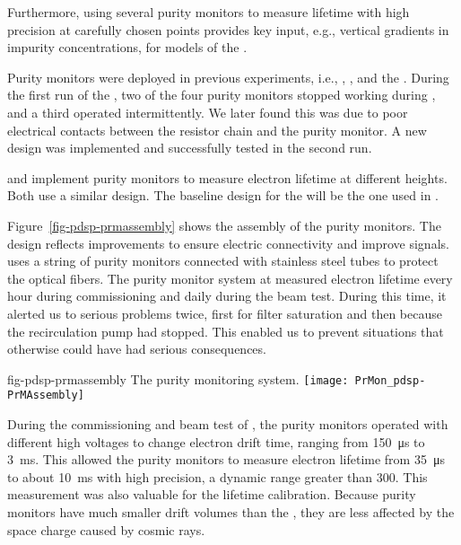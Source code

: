 Furthermore, using several purity monitors to measure lifetime with high precision at carefully chosen points provides key input, e.g.,  vertical gradients in impurity concentrations, for  models of the .

Purity monitors were deployed in previous  experiments, i.e., , \microboone, and the . During the first run of the , two of the four purity monitors stopped working during \cooldown, and a third operated intermittently. We later found this was due to poor electrical contacts between the resistor chain and the purity monitor. A new design was implemented and successfully tested in the second run. 



 and  %
implement purity monitors to %
measure electron lifetime at different heights.  
Both use a similar design. The baseline design for the   will be the one used in .
 
Figure~\ref{fig-pdsp-prmassembly} shows the assembly of the  purity monitors. The design reflects improvements to ensure electric connectivity and improve signals.  uses a string of purity monitors connected with stainless steel tubes to protect the optical fibers. The purity monitor system at  measured electron lifetime every hour during commissioning and daily during the beam test. During %
this time, it %
alerted us to serious problems twice, first %
for filter saturation and %
then because the recirculation pump had stopped. This enabled us to prevent %
situations that otherwise could have had serious consequences.

\begin{dunefigure}{fig-pdsp-prmassembly}
  {The  purity monitoring system.}
  \texttt{[image: PrMon\_pdsp-PrMAssembly]}
\end{dunefigure}



During the commissioning and beam test of , the purity monitors operated with different high voltages to change electron drift time, ranging from \SI{150}{\micro\second} to \SI{3}{\milli\second}. This allowed the  purity monitors to measure electron lifetime from \SI{35}{\micro\second} to about \SI{10}{\milli\second} with high precision, a dynamic range greater than \num{300}. 
This measurement was also valuable for the  lifetime calibration. Because purity monitors have much smaller drift volumes than the , they are less affected by the space charge caused by cosmic rays. 

